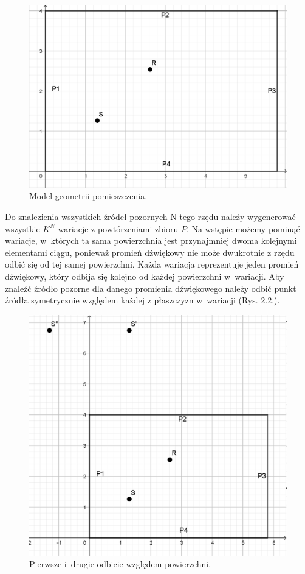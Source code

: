 \begin{figure}[h]
        \centering
                \centering
                \includegraphics[width=12cm]{rys1}
	\caption{Model geometrii pomieszczenia.}
\end{figure}

Do znalezienia wszystkich źródeł pozornych N-tego rzędu należy wygenerować wszystkie $K^N$ wariacje z powtórzeniami zbioru $P$. Na wstępie możemy pominąć wariacje, w~których ta sama powierzchnia jest przynajmniej dwoma kolejnymi elementami ciągu, ponieważ promień dźwiękowy nie może dwukrotnie z rzędu odbić się od tej samej powierzchni. Każda wariacja reprezentuje jeden promień dźwiękowy, który odbija się kolejno od każdej powierzchni w~wariacji. Aby znaleźć źródło pozorne dla danego promienia dźwiękowego należy odbić punkt źródła symetrycznie względem każdej z płaszczyzn w~wariacji (Rys. 2.2.). 

\begin{figure}[h]
        \centering
                \centering
                \includegraphics[width=12cm]{rys2}
	\caption{Pierwsze i~drugie odbicie względem powierzchni.}
\end{figure}

